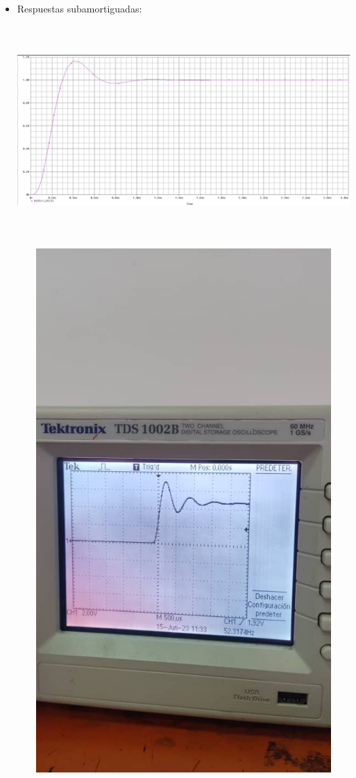 \documentclass[12pt]{article}
\begin{document}
\begin{enumerate}
    	\begin{itemize}
    		
    		\item Respuestas subamortiguadas:
    		
    		\begin{center}
    			\includegraphics[width=16cm,height=8cm]{Img/subamor_1}
    		\end{center}
    		
    		\begin{center}
    			\includegraphics[width=16cm,height=20cm]{Img/subamor_lab1}
    		\end{center}
    		

\end{itemize}
\end{enumerate}
\end{document}

